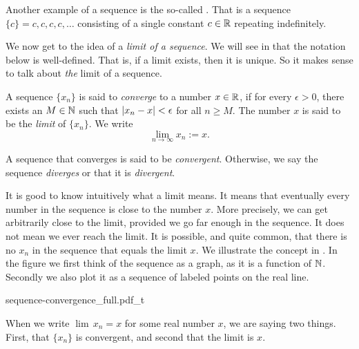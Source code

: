 Another example of a sequence is the so-called \emph{}.
That is a sequence $\{ c \} = c,c,c,c,\ldots$ consisting of a single
constant $c \in {\mathbb{R}}$ repeating indefinitely.

We now get to the idea of a
\emph{limit of a sequence}.  We will
see in 
that the notation below is well-defined.  That is, if a limit exists, then
it is unique.  So it makes sense to talk about \emph{the} limit of a sequence.

\begin{defn}
A sequence $\{ x_n \}$ is said to \emph{converge} to a number
$x \in {\mathbb{R}}$, if for every $\epsilon > 0$, there exists an $M \in {\mathbb{N}}$ such
that $\left\lvert {x_n - x} \right\rvert < \epsilon$ for all $n \geq M$.  The number $x$
is said to be the \emph{limit} of $\{ x_n \}$.  We write
\begin{equation*}
\lim_{n\to \infty} x_n := x .
\end{equation*}

A sequence
that converges is said to be \emph{convergent}.
Otherwise, we say the sequence \emph{diverges}
or that it is
\emph{divergent}.
\end{defn}

It is good to know intuitively what a limit means.  It means that eventually
every number in the sequence is close to the number $x$.  More precisely,
we can get arbitrarily close to the limit, provided we go far enough in the
sequence.  It does not mean we ever reach the limit.  It is possible,
and quite common, that there is no $x_n$ in the sequence that equals the
limit $x$.
We illustrate the concept in .  In the
figure we first think of the sequence as a graph, as it is a function of
${\mathbb{N}}$.   Secondly we also plot it as a sequence of labeled points on the real
line.

\begin{myfigureht}
{sequence-convergence_full.pdf_t}
\caption{Illustration of convergence.  On top, the first ten points of the sequence as a graph
with $M$ and the interval around the limit $x$ marked.  On bottom, the points of the same sequence marked on the
number line.\label{figsequenceconvergence}}
\end{myfigureht}

When we write $\lim\, x_n = x$ for some real number $x$, we are saying two
things.  First, that $\{ x_n \}$ is convergent, and second that the limit is
$x$.

